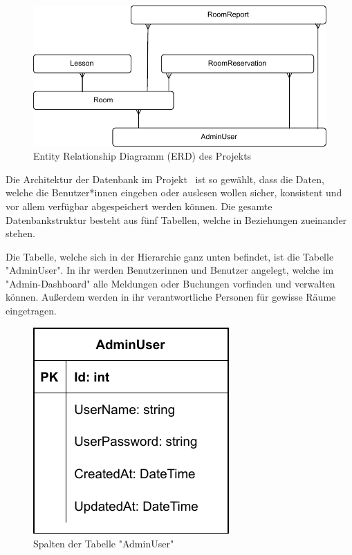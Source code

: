 
\begin{figure}[H]
    \centering
    \includegraphics{media/MariaDB/ERD.svg.pdf}
    \caption{Entity Relationship Diagramm (ERD) des Projekts}
\end{figure}

Die Architektur der Datenbank im Projekt \ZELIA\ ist so gewählt, dass die Daten, welche die Benutzer*innen eingeben oder auslesen wollen sicher, konsistent und vor allem verfügbar abgespeichert werden können. Die gesamte Datenbankstruktur besteht aus fünf Tabellen, welche in Beziehungen zueinander stehen.


Die Tabelle, welche sich in der Hierarchie ganz unten befindet, ist die Tabelle "AdminUser". In ihr werden Benutzerinnen und Benutzer angelegt, welche im "Admin-Dashboard" alle Meldungen oder Buchungen vorfinden und verwalten können. Außerdem werden in ihr verantwortliche Personen für gewisse Räume eingetragen.

\begin{figure}[H]
    \centering
    \includegraphics{media/MariaDB/AdminUser.svg.pdf}
    \caption{Spalten der Tabelle "AdminUser"}
    \label{fig:AdminUserColls}
\end{figure}

